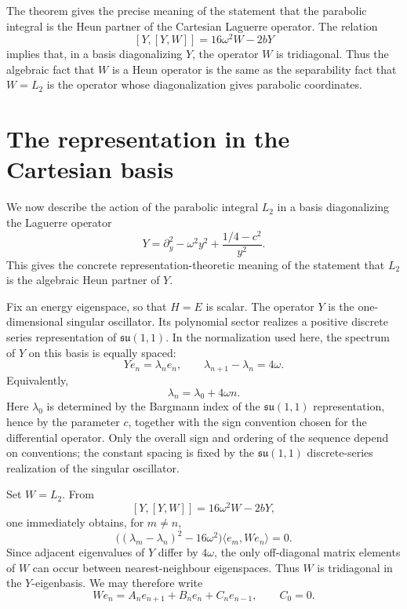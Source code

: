 \documentclass[11pt]{article}
\numberwithin{equation}{section}
\theoremstyle{definition}
\theoremstyle{remark}
\begin{document}
The theorem gives the precise meaning of the statement that the parabolic
integral is the Heun partner of the Cartesian Laguerre operator.  The relation
\[
        [Y,[Y,W]]=16\omega^2W-2bY
\]
implies that, in a basis diagonalizing \(Y\), the operator \(W\) is
tridiagonal.  Thus the algebraic fact that \(W\) is a Heun operator is the
same as the separability fact that \(W=L_2\) is the operator whose
diagonalization gives parabolic coordinates.

\section{The representation in the Cartesian basis}

We now describe the action of the parabolic integral \(L_2\) in a basis
diagonalizing the Laguerre operator
\[
        Y=\partial_y^2-\omega^2y^2+\frac{1/4-c^2}{y^2}.
\]
This gives the concrete representation-theoretic meaning of the statement
that \(L_2\) is the algebraic Heun partner of \(Y\).

Fix an energy eigenspace, so that \(H=E\) is scalar.  The operator \(Y\) is
the one-dimensional singular oscillator.  Its polynomial sector realizes a
positive discrete series representation of \(\mathfrak{su}(1,1)\).  In the
normalization used here, the spectrum of \(Y\) on this basis is equally
spaced:
\begin{equation}
        Y e_n=\lambda_n e_n,
        \qquad
        \lambda_{n+1}-\lambda_n=4\omega .
        \label{eq:Y-spectrum}
\end{equation}
Equivalently,
\begin{equation}
        \lambda_n=\lambda_0+4\omega n.
        \label{eq:lambda-linear}
\end{equation}
Here \(\lambda_0\) is determined by the Bargmann index of the
\(\mathfrak{su}(1,1)\) representation, hence by the parameter \(c\), together
with the sign convention chosen for the differential operator.  Only the
overall sign and ordering of the sequence depend on conventions; the constant
spacing is fixed by the \(\mathfrak{su}(1,1)\) discrete-series realization of
the singular oscillator.

Set \(W=L_2\).  From
\[
        [Y,[Y,W]]=16\omega^2W-2bY,
\]
one immediately obtains, for \(m\neq n\),
\begin{equation}
        \big((\lambda_m-\lambda_n)^2-16\omega^2\big)
        \langle e_m,W e_n\rangle=0.
        \label{eq:tri-condition}
\end{equation}
Since adjacent eigenvalues of \(Y\) differ by \(4\omega\), the only
off-diagonal matrix elements of \(W\) can occur between nearest-neighbour
eigenspaces.  Thus \(W\) is tridiagonal in the \(Y\)-eigenbasis.  We may
therefore write
\begin{equation}
        W e_n
        =
        A_n e_{n+1}+B_n e_n+C_n e_{n-1},
        \qquad C_0=0.
        \label{eq:W-action}
\end{equation}
\end{document}
